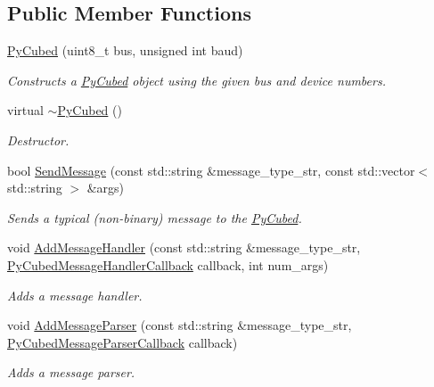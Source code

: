 \subsection*{Public Member Functions}
\begin{DoxyCompactItemize}
\item 
\hyperlink{classcubesat_1_1PyCubed_a30b6d7ca9cc3d8d4151eca7525c9dc61}{Py\+Cubed} (uint8\+\_\+t bus, unsigned int baud)
\begin{DoxyCompactList}\small\item\em Constructs a \hyperlink{classcubesat_1_1PyCubed}{Py\+Cubed} object using the given bus and device numbers. \end{DoxyCompactList}\item 
virtual \hyperlink{classcubesat_1_1PyCubed_ae9a69fbb6fb5df1d15984b0e11727aaa}{$\sim$\+Py\+Cubed} ()
\begin{DoxyCompactList}\small\item\em Destructor. \end{DoxyCompactList}\item 
bool \hyperlink{classcubesat_1_1PyCubed_a18980909f0eac65f0977be35336a533c}{Send\+Message} (const std\+::string \&message\+\_\+type\+\_\+str, const std\+::vector$<$ std\+::string $>$ \&args)
\begin{DoxyCompactList}\small\item\em Sends a typical (non-\/binary) message to the \hyperlink{classcubesat_1_1PyCubed}{Py\+Cubed}. \end{DoxyCompactList}\item 
void \hyperlink{classcubesat_1_1PyCubed_a1607d57f2cd19bd3b75a2c3dbbfa4955}{Add\+Message\+Handler} (const std\+::string \&message\+\_\+type\+\_\+str, \hyperlink{namespacecubesat_a3b98f17d41bf0e37fe0d382b897f9692}{Py\+Cubed\+Message\+Handler\+Callback} callback, int num\+\_\+args)
\begin{DoxyCompactList}\small\item\em Adds a message handler. \end{DoxyCompactList}\item 
void \hyperlink{classcubesat_1_1PyCubed_a7ed5f976ac8923ac539a863d89df4776}{Add\+Message\+Parser} (const std\+::string \&message\+\_\+type\+\_\+str, \hyperlink{namespacecubesat_ad7197c1bfb09998ced84827cb0dd1680}{Py\+Cubed\+Message\+Parser\+Callback} callback)
\begin{DoxyCompactList}\small\item\em Adds a message parser. \end{DoxyCompactList}\item 

\end{DoxyCompactItemize}
